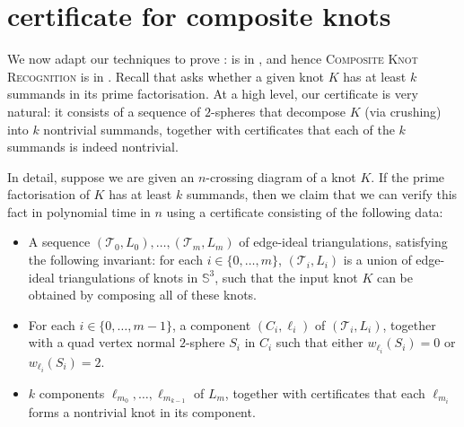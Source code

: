 \documentclass[10pt,a4paper]{amsart}
\newcommand{\tri}{\mathcal{T}}
\begin{document}
\section{\texorpdfstring{\NP}{NP} certificate for composite knots}\label{sec:np}

We now adapt our techniques to prove :
 is in \NP, and hence \textsc{Composite Knot Recognition} is in \NP.
Recall that  asks whether a given knot $K$ has at least $k$ summands in its prime factorisation.
At a high level, our certificate is very natural:
it consists of a sequence of $2$-spheres that decompose $K$ (via crushing) into
$k$ nontrivial summands, together with certificates that each of the $k$ summands is indeed nontrivial.

In detail, suppose we are given an $n$-crossing diagram of a knot $K$.
If the prime factorisation of $K$ has at least $k$ summands, then we claim that we can
verify this fact in polynomial time in $n$ using a certificate consisting of the following data:
\begin{itemize}
\item
A sequence $(\tri_0,L_0), \ldots, (\tri_m,L_m)$ of edge-ideal triangulations, satisfying the following invariant:
for each $i\in \{0,\ldots,m\}$, $(\tri_i,L_i)$ is a union of edge-ideal triangulations of knots in $\mathbb{S}^3$,
such that the input knot $K$ can be obtained by composing all of these knots.
\item
For each $i \in \{0, \ldots, m-1\}$, a component $(C_i,\ell_i)$ of $(\tri_i,L_i)$, together with a quad vertex normal
$2$-sphere $S_i$ in $C_i$ such that either $w_{\ell_i}(S_i) = 0$ or $w_{\ell_i}(S_i) = 2$.
\item $k$ components $\ell_{m_0}, \ldots, \ell_{m_{k-1}}$ of $L_m$, together with certificates that each $\ell_{m_i}$ forms a nontrivial knot in its component.
\end{itemize}
\end{document}
